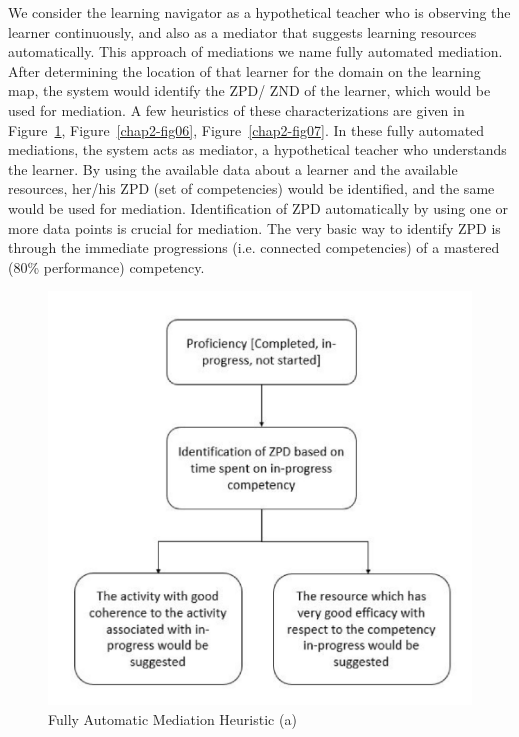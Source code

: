 \begin{multicols}{2}
We consider the learning navigator as a hypothetical teacher who is observing the learner continuously, and also as a mediator that suggests learning resources automatically. This approach of mediations we name fully automated mediation. After determining the location of that learner for the domain on the learning map, the system would identify the ZPD/ ZND of the learner, which would be used for mediation. A few heuristics of these characterizations are given in Figure~\ref{chap2-fig05}, Figure~\ref{chap2-fig06}, Figure~\ref{chap2-fig07}. In these fully automated mediations, the system acts as mediator, a hypothetical teacher who understands the learner. By using the available data about a learner and the available resources, her/his ZPD (set of competencies) would be identified, and the same would be used for mediation. Identification of ZPD automatically by using one or more data points is crucial for mediation. The very basic way to identify ZPD is through the immediate progressions (i.e. connected competencies) of a mastered (80\% performance) competency.
\begin{figure}[H]
\centering
\includegraphics[scale=.75]{src/Figures/chap2/chap2-fig05.jpg}
\caption{Fully Automatic Mediation Heuristic (a)}\label{chap2-fig05}
\end{figure}


\end{multicols}
